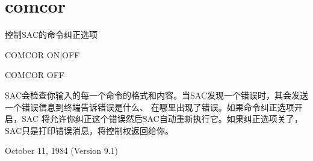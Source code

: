 \section{comcor}
\label{cmd:comcor}

控制SAC的命令纠正选项

COMCOR {ON|OFF}

COMCOR OFF

SAC会检查你输入的每一个命令的格式和内容。当SAC发现一个错误时，其会发送一个错误信息到终端告诉错误是什么、
在哪里出现了错误。如果命令纠正选项开启，SAC	将允许你纠正这个错误然后SAC自动重新执行它。如果纠正选项关了，
SAC只是打印错误消息，将控制权返回给你。

October 11, 1984 (Version 9.1)
